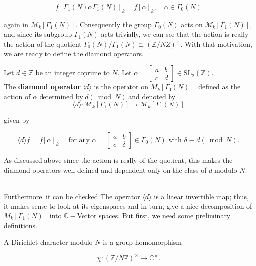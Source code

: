$$
f\left[\Gamma_{1}(N) \alpha \Gamma_{1}(N)\right]_{k}=f[\alpha]_{k}, \quad \alpha \in \Gamma_{0}(N)
$$

again in $\mathcal{M}_{k}\left[\Gamma_{1}(N)\right]$. Consequently the group $\Gamma_{0}(N)$ acts on $\mathcal{M}_{k}\left[\Gamma_{1}(N)\right]$, and since its subgroup $\Gamma_{1}(N)$ acts trivially, we can see that the action is really the action of the quotient $\Gamma_{0}(N) / \Gamma_{1}(N) \cong(\mathbb{Z} / N Z)^{\times}$. With that motivation, we are ready to define the diamond operators. 

\begin{definition}
    Let $d \in \mathbb{Z}$ be an integer coprime to $N$. Let $\alpha=\left[\begin{array}{ll}a & b \\ c & d\end{array}\right]\in \mathrm{SL_2(\mathbb{Z})}$.\\ The \textbf{diamond operator} $\langle d\rangle$ is the operator on $M_{k}\left[\Gamma_{1}(N)\right].$ defined as the action of $\alpha$ determined by $d(\bmod N) $ and denoted by $$
\langle d\rangle: \mathcal{M}_{k}\left[\Gamma_{1}(N)\right] \longrightarrow \mathcal{M}_{k}\left[\Gamma_{1}(N)\right]
$$

given by

$$
\langle d\rangle f=f[\alpha]_{k} \quad \text { for any } \alpha=\left[\begin{array}{ll}
a & b \\
c & \delta
\end{array}\right] \in \Gamma_{0}(N) \text { with } \delta \equiv d(\bmod N) .
$$


\end{definition}
As discussed above since the action is really of the quotient, this makes the diamond operators well-defined and dependent only on the class of $d$ modulo $N$. 

\\ Furthermore, it can be checked The operator $\langle d\rangle$ is a linear invertible map; thus, it makes sense to look at its eigenspaces and in turn, give a nice decomposition of $M_{k}\left[\Gamma_{1}(N)\right]$ into $\mathbb{C}-$Vector spaces. But first, we need some preliminary definitions. 
\begin{definition}
    A Dirichlet character modulo $N$ is a group homomorphism

$$
\chi:(\mathbb{Z} / N \mathbb{Z})^{\times} \rightarrow \mathbb{C}^{\times} .
$$

\end{definition}


